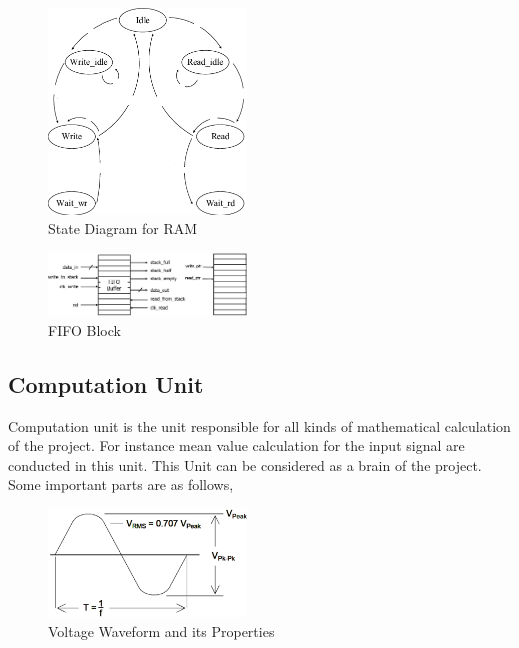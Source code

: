 \documentclass[paper]{IEEEtran}
\begin{document}
\begin{figure}[h!]
			\setlength{\unitlength}{\textwidth}
			\center 
			\includegraphics[width=0.47\textwidth]{RAM_state}
			\caption{\label{fig:RAM State} State Diagram for RAM}
\end{figure}

\begin{figure}[h!]
	\setlength{\unitlength}{\textwidth}
	\center 
	\includegraphics[width=0.47\textwidth]{fifo_ports}
	\caption{\label{fig:fifo_ports} FIFO Block}
\end{figure}
		
		
\subsection{Computation Unit} \- \indent
	Computation unit is the unit responsible for all kinds of mathematical calculation of the project. For instance mean value calculation for the input signal are conducted in this unit. This Unit can be considered as a brain of the project. Some important parts are as follows,	



\begin{figure}[h!]
	\setlength{\unitlength}{\textwidth}
	\center 
	\includegraphics[width=0.47\textwidth]{voltage}
	\caption{\label{fig:waveform} Voltage Waveform and its Properties}
\end{figure}
\end{document}
